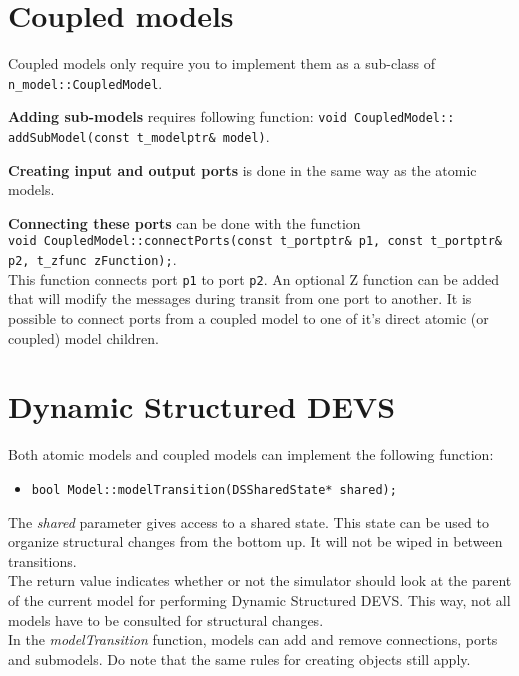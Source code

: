 \section{Coupled models}
Coupled models only require you to implement them as a sub-class of \\ \texttt{n\_model::CoupledModel}.

\textbf{Adding sub-models} requires following function: \texttt{void CoupledModel:: \\addSubModel(const t\_modelptr\& model)}.

\textbf{Creating input and output ports} is done in the same way as the atomic models.

\textbf{Connecting these ports} can be done with the function\\ \texttt{void CoupledModel::connectPorts(const t\_portptr\& p1, const t\_portptr\& p2, t\_zfunc zFunction);}.\\ This function connects port \texttt{p1} to port \texttt{p2}. An optional Z function can be added that will modify the messages during transit from one port to another.
It is possible to connect ports from a coupled model to one of it's direct atomic (or coupled) model children.

\section{Dynamic Structured DEVS}
Both atomic models and coupled models can implement the following function:
\begin{itemize}
	\item \texttt{bool Model::modelTransition(DSSharedState* shared);}
\end{itemize}
The \textsl{shared} parameter gives access to a shared state. This state can be used to organize structural changes from the bottom up. It will not be wiped in between transitions.\\
The return value indicates whether or not the simulator should look at the parent of the current model for performing Dynamic Structured DEVS. This way, not all models have to be consulted for structural changes.\\
In the \textsl{modelTransition} function, models can add and remove connections, ports and submodels. Do note that the same rules for creating objects still apply.

